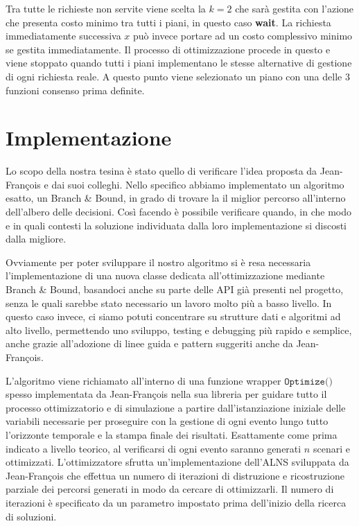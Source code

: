 \documentclass[
    article,            %
    12pt,                %
    oneside,            %
    a4paper,            %
    english,            %
    italian,                %
    sumario=tradicional,
]{abntex2}
\begin{document}
Tra tutte le richieste non servite viene scelta la {\(k=2\)} che sarà gestita con l'azione che presenta costo minimo tra tutti i piani, in questo caso \textbf{wait}. La richiesta immediatamente successiva $x$ può invece portare ad un costo complessivo minimo se gestita immediatamente. Il processo di ottimizzazione procede in questo e viene stoppato quando tutti i piani implementano le stesse alternative di gestione di ogni richiesta reale. A questo punto viene selezionato un piano con una delle 3 funzioni consenso prima definite.

\section{Implementazione}
Lo scopo della nostra tesina è stato quello di verificare l'idea proposta da Jean-François e dai suoi colleghi. Nello specifico abbiamo implementato un algoritmo esatto, un Branch \& Bound, in grado di trovare la il miglior percorso all'interno dell'albero delle decisioni. Così facendo è possibile verificare quando, in che modo e in quali contesti la soluzione individuata dalla loro implementazione si discosti dalla migliore.

Ovviamente per poter sviluppare il nostro algoritmo si è resa necessaria l'implementazione di una nuova classe dedicata all'ottimizzazione mediante Branch \& Bound, basandoci anche su parte delle API già presenti nel progetto, senza le quali sarebbe stato necessario un lavoro molto più a basso livello. In questo caso invece, ci siamo potuti concentrare su strutture dati e algoritmi ad alto livello, permettendo uno sviluppo, testing e debugging più rapido e semplice, anche grazie all'adozione di linee guida e pattern suggeriti anche da Jean-François.

L'algoritmo viene richiamato all'interno di una funzione wrapper $\texttt{Optimize()}$ spesso implementata da Jean-François nella sua libreria per guidare tutto il processo ottimizzatorio e di simulazione a partire dall'istanziazione iniziale delle variabili necessarie per proseguire con la gestione di ogni evento lungo tutto l'orizzonte temporale e la stampa finale dei risultati. Esattamente come prima indicato a livello teorico, al verificarsi di ogni evento saranno generati $n$ scenari e ottimizzati. L'ottimizzatore sfrutta un'implementazione dell'ALNS \cite{Ropke} sviluppata da Jean-François che effettua un numero di iterazioni di distruzione e ricostruzione parziale dei percorsi generati in modo da cercare di ottimizzarli. Il numero di iterazioni è specificato da un parametro impostato prima dell'inizio della ricerca di soluzioni.
\end{document}
